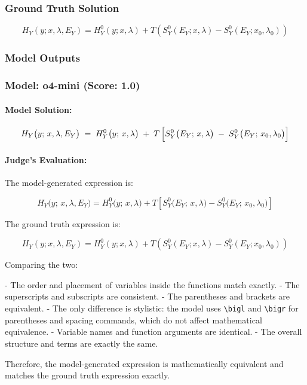 \documentclass[10pt]{article}
\begin{document}
\subsubsection*{Ground Truth Solution}
\[ \boxed{H_Y(y; x,\lambda,E_Y) = H^0_Y(y; x,\lambda) + T \left( S^0_Y(E_Y; x,\lambda) - S^0_Y(E_Y; x_0,\lambda_0) \right)} \]

\subsubsection*{Model Outputs}
\subsubsection*{Model: o4-mini (Score: 1.0)}
\paragraph*{Model Solution:}
\[ H_Y\bigl(y;\,x,\lambda,E_Y\bigr)
\;=\;
H_Y^0\bigl(y;\,x,\lambda\bigr)
\;+\;
T\,
\Bigl[
   S_Y^0\bigl(E_Y;\,x,\lambda\bigr)
   \;-\;
   S_Y^0\bigl(E_Y;\,x_0,\lambda_0\bigr)
\Bigr] \]

\paragraph*{Judge's Evaluation:}

The model-generated expression is:

\[
H_Y\bigl(y;\,x,\lambda,E_Y\bigr)
= H_Y^0\bigl(y;\,x,\lambda\bigr)
+ T \left[
   S_Y^0\bigl(E_Y;\,x,\lambda\bigr)
   - S_Y^0\bigl(E_Y;\,x_0,\lambda_0\bigr)
\right]
\]

The ground truth expression is:

\[
H_Y(y; x,\lambda,E_Y) = H^0_Y(y; x,\lambda) + T \left( S^0_Y(E_Y; x,\lambda) - S^0_Y(E_Y; x_0,\lambda_0) \right)
\]

Comparing the two:

- The order and placement of variables inside the functions match exactly.
- The superscripts and subscripts are consistent.
- The parentheses and brackets are equivalent.
- The only difference is stylistic: the model uses \verb|\bigl| and \verb|\bigr| for parentheses and spacing commands, which do not affect mathematical equivalence.
- Variable names and function arguments are identical.
- The overall structure and terms are exactly the same.

Therefore, the model-generated expression is mathematically equivalent and matches the ground truth expression exactly.
\end{document}
